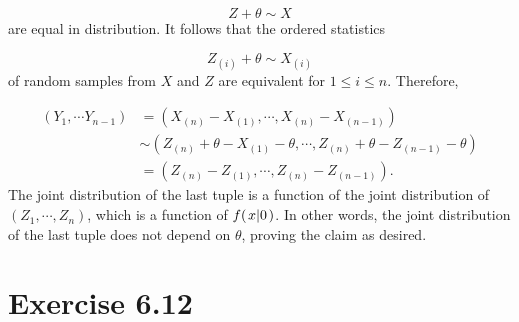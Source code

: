 \documentclass[12pt,letterpaper,reqno]{amsart}
\numberwithin{equation}{subsection}
\begin{document}
\[ Z + \theta \sim X \] 
are equal in distribution. It follows that the ordered statistics

\[ Z_{(i)} + \theta \sim X_{(i)} \]
of random samples from $X$ and $Z$ are equivalent for $1 \leq i \leq n$. Therefore,

\begin{align*}
    \left( Y_1, \cdots Y_{n - 1} \right) &= \left( X_{(n)} - X_{(1)}, \cdots, X_{(n)} - X_{(n - 1)} \right) \\
    &\sim \left( Z_{(n)} + \theta - X_{(1)} - \theta, \cdots, Z_{(n)} + \theta - Z_{(n - 1)} - \theta \right) \\
    &= \left( Z_{(n)} - Z_{(1)}, \cdots, Z_{(n)} - Z_{(n - 1)} \right).
\end{align*}
The joint distribution of the last tuple is a function of the joint distribution of $(Z_1, \cdots, Z_n)$, which is a function of ${f}\! \left( {\left. {x} \middle| {0} \right.} \right)$. In other words, the joint distribution of the last tuple does not depend on $\theta$, proving the claim as desired.
\newpage
\section{Exercise 6.12}
\end{document}
